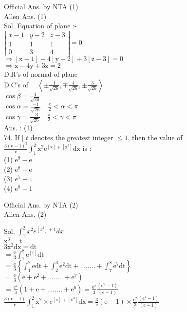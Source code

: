 \documentclass[10pt]{article}
\begin{document}
Official Ans. by NTA (1)\\
Allen Ans. (1)\\
Sol. Equation of plane :-\\
\(\left|\begin{array}{ccc}x-1 & y-2 & z-3 \\ 1 & 1 & 1 \\ 0 & 3 & 4\end{array}\right|=0\)\\
\(\Rightarrow[\mathrm{x}-1]-4[\mathrm{y}-2]+3[\mathrm{z}-3]=0\)\\
\(\Rightarrow \mathrm{x}-4 \mathrm{y}+3 \mathrm{z}=2\)\\
D.R's of normal of plane \(<1,-4,3>\)\\
D.C's of \(\quad\left\langle \pm \frac{1}{\sqrt{26}}, \mp \frac{4}{\sqrt{26}}, \pm \frac{3}{\sqrt{26}}\right\rangle\)\\
\(\cos \beta=\frac{4}{\sqrt{26}}\)\\
\(\cos \alpha=\frac{-1}{\sqrt{26}} \quad \frac{\pi}{2}<\alpha<\pi\)\\
\(\cos \gamma=\frac{-3}{\sqrt{26}} \quad \frac{\pi}{2}<\gamma<\pi\)\\
Ans. : (1)\\
74. If [ \(t\) denotes the greatest integer \(\leq 1\), then the value of \(\frac{3(\mathrm{e}-1)^{2}}{\mathrm{e}} \int_{1}^{2} \mathrm{x}^{2} \mathrm{e}^{[\mathrm{x}]+\left[\mathrm{x}^{3}\right]} \mathrm{dx}\) is :\\
(1) \(\mathrm{e}^{9}-\mathrm{e}\)\\
(2) \(\mathrm{e}^{8}-\mathrm{e}\)\\
(3) \(e^{7}-1\)\\
(4) \(\mathrm{e}^{8}-1\)

Official Ans. by NTA (2)\\
Allen Ans. (2)

Sol. \(\int_{1}^{2} x^{2} e^{\left[x^{3}\right]+1} d x\)\\
\(\mathrm{x}^{3}=\mathrm{t}\)\\
\(3 \mathrm{x}^{2} \mathrm{dx}=\mathrm{dt}\)\\
\(=\frac{\mathrm{e}}{3} \int_{1}^{8} \mathrm{e}^{[\mathrm{t}]} \mathrm{dt}\)\\
\(=\frac{\mathrm{e}}{3}\left\{\int_{1}^{2} \mathrm{edt}+\int_{2}^{3} \mathrm{e}^{2} \mathrm{dt}+\ldots \ldots . .+\int_{7}^{8} \mathrm{e}^{7} \mathrm{dt}\right\}\)\\
\(=\frac{\mathrm{e}}{3}\left(\mathrm{e}+\mathrm{e}^{2}+\ldots \ldots . .+\mathrm{e}^{7}\right)\)\\
\(=\frac{\mathrm{e}^{2}}{3}\left(1+\mathrm{e}+\ldots \ldots . .+\mathrm{e}^{6}\right)=\frac{\mathrm{e}^{2}}{3} \frac{\left(\mathrm{e}^{7}-1\right)}{(\mathrm{e}-1)}\)\\
\(\frac{3(\mathrm{e}-1)}{\mathrm{e}} \int_{1}^{2} \mathrm{x}^{2} \times \mathrm{e}^{[\mathrm{x}]+\left[\mathrm{x}^{3}\right]} \mathrm{dx}=\frac{3}{\mathrm{e}}(\mathrm{e}-1) \times \frac{\mathrm{e}^{2}}{3} \frac{\left(\mathrm{e}^{7}-1\right)}{(\mathrm{e}-1)}\)
\end{document}
